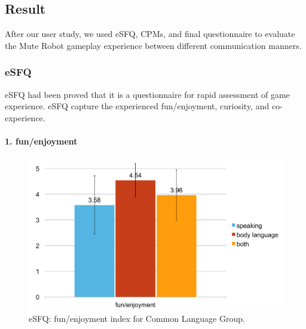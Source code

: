 

\subsection{Result}
After our user study, we used eSFQ, CPMs, and final questionnaire to evaluate the Mute Robot gameplay experience between different communication manners.

\subsubsection{eSFQ}
eSFQ\cite{eSFQ} had been proved that it is a questionnaire for rapid assessment of game experience. eSFQ capture the experienced fun/enjoyment, curiosity, and co-experience. 

\paragraph{1. fun/enjoyment}

\begin{figure}[!h]
\centering
\includegraphics[width=0.9\columnwidth]{Figures/US_Fun_Com.pdf}
\caption{eSFQ: fun/enjoyment index for Common Language Group.}
\label{fig:US_Fun_Com}
\end{figure}

